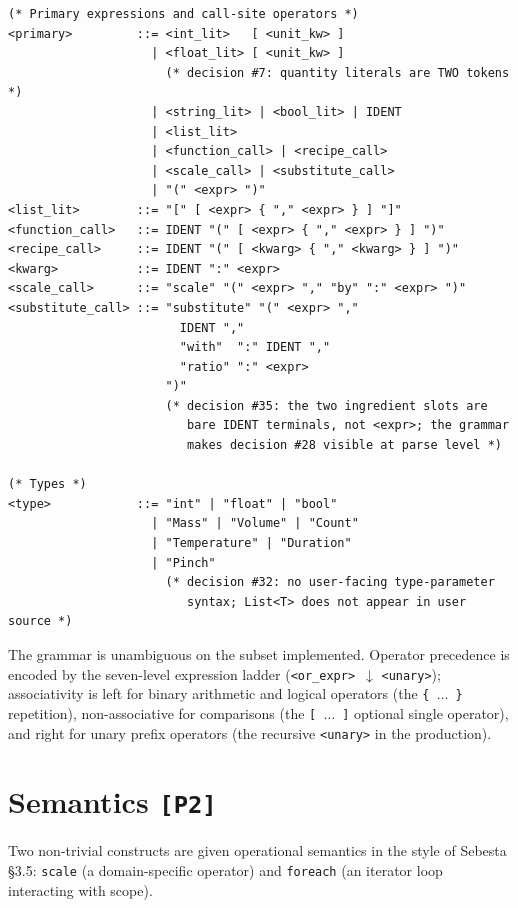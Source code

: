 \documentclass[11pt,a4paper]{article}
\begin{document}
\begin{lstlisting}
(* Primary expressions and call-site operators *)
<primary>         ::= <int_lit>   [ <unit_kw> ]
                    | <float_lit> [ <unit_kw> ]
                      (* decision #7: quantity literals are TWO tokens *)
                    | <string_lit> | <bool_lit> | IDENT
                    | <list_lit>
                    | <function_call> | <recipe_call>
                    | <scale_call> | <substitute_call>
                    | "(" <expr> ")"
<list_lit>        ::= "[" [ <expr> { "," <expr> } ] "]"
<function_call>   ::= IDENT "(" [ <expr> { "," <expr> } ] ")"
<recipe_call>     ::= IDENT "(" [ <kwarg> { "," <kwarg> } ] ")"
<kwarg>           ::= IDENT ":" <expr>
<scale_call>      ::= "scale" "(" <expr> "," "by" ":" <expr> ")"
<substitute_call> ::= "substitute" "(" <expr> ","
                        IDENT ","
                        "with"  ":" IDENT ","
                        "ratio" ":" <expr>
                      ")"
                      (* decision #35: the two ingredient slots are
                         bare IDENT terminals, not <expr>; the grammar
                         makes decision #28 visible at parse level *)

(* Types *)
<type>            ::= "int" | "float" | "bool"
                    | "Mass" | "Volume" | "Count"
                    | "Temperature" | "Duration"
                    | "Pinch"
                      (* decision #32: no user-facing type-parameter
                         syntax; List<T> does not appear in user source *)
\end{lstlisting}

\noindent The grammar is unambiguous on the subset implemented. Operator
precedence is encoded by the seven-level expression ladder
(\texttt{<or\_expr>}~$\downarrow$ \texttt{<unary>}); associativity is
left for binary arithmetic and logical operators (the \texttt{\{~$\dots$~\}}
repetition), non-associative for comparisons (the \texttt{[~$\dots$~]}
optional single operator), and right for unary prefix operators
(the recursive \texttt{<unary>} in the production).


\section{Semantics \texttt{[P2]}}

Two non-trivial constructs are given operational semantics in the style
of Sebesta \S3.5: \texttt{scale} (a domain-specific operator) and
\texttt{foreach} (an iterator loop interacting with scope).
\end{document}
